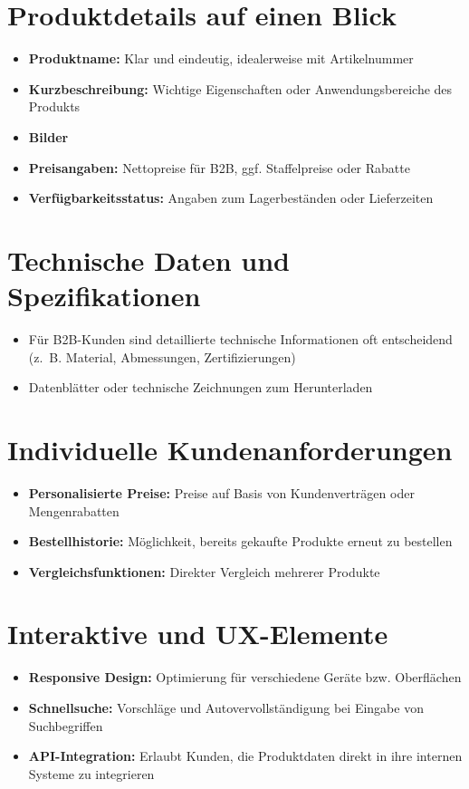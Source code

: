 \documentclass[%
	ngerman,
	12pt,
	a4paper,
	oneside,
	parskip=full
]{scrbook}
\begin{document}
\section{Produktdetails auf einen Blick}
\begin{itemize}
	\item \textbf{Produktname:} Klar und eindeutig, idealerweise mit Artikelnummer
	\item \textbf{Kurzbeschreibung:} Wichtige Eigenschaften oder Anwendungsbereiche des Produkts
	\item \textbf{Bilder}
	\item \textbf{Preisangaben:} Nettopreise für B2B, ggf. Staffelpreise oder Rabatte
	\item \textbf{Verfügbarkeitsstatus:} Angaben zum Lagerbeständen oder Lieferzeiten
\end{itemize}
\section{Technische Daten und Spezifikationen}
\begin{itemize}
	\item Für B2B-Kunden sind detaillierte technische Informationen oft entscheidend (z.~B. Material, Abmessungen, Zertifizierungen)
	\item Datenblätter oder technische Zeichnungen zum Herunterladen
\end{itemize}
\section{Individuelle Kundenanforderungen}
\begin{itemize}
	\item \textbf{Personalisierte Preise:} Preise auf Basis von Kundenverträgen oder Mengenrabatten
	\item \textbf{Bestellhistorie:} Möglichkeit, bereits gekaufte Produkte erneut zu bestellen
	\item \textbf{Vergleichsfunktionen:} Direkter Vergleich mehrerer Produkte
\end{itemize}
\section{Interaktive und UX-Elemente}
\begin{itemize}
	\item \textbf{Responsive Design:} Optimierung für verschiedene Geräte bzw. Oberflächen
	\item \textbf{Schnellsuche:} Vorschläge und Autovervollständigung bei Eingabe von Suchbegriffen
	\item \textbf{API-Integration:} Erlaubt Kunden, die Produktdaten direkt in ihre internen Systeme zu integrieren
\end{itemize}
\end{document}
